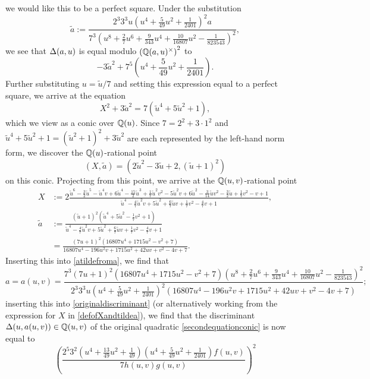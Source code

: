we would like this to be a perfect square. Under the substitution 
\begin{equation} \label{atildefroma}
\tilde{a} := \frac{2^3 3^3 u \left(u^4 + \frac{5}{49}u^2 + \frac{1}{2401}\right)^2 a}{7^3 \left(u^8 + \frac{2}{7}u^6 + \frac{9}{343}u^4 + \frac{10}{16807}u^2 - \frac{1}{823543} \right)^2}, 
\end{equation}
we see that $\Delta(a,u)$ is equal modulo $\left( \mathbb{Q}(a,u)^\times \right)^2$ to 
\[
- 3 \tilde{a}^2 + 7^5 \left( u^4 + \frac{5}{49}u^2 + \frac{1}{2401} \right).
\]
Further substituting $u = \tilde{u}/7$ and setting this expression equal to a perfect square, we arrive at the equation
\[
X^2 + 3 \tilde{a}^2 = 7 \left( \tilde{u}^4 + 5\tilde{u}^2 + 1 \right),
\]
which we view as a conic over $\mathbb{Q}(u)$. Since $7 = 2^2 + 3 \cdot 1^2$ and $\tilde{u}^4 + 5\tilde{u}^2 + 1 = (\tilde{u}^2+1)^2 + 3\tilde{u}^2$ are each represented by the left-hand norm form, we discover the $\mathbb{Q}(u)$-rational point
\[
(X,\tilde{a}) = \left( 2\tilde{u}^2 - 3\tilde{u} + 2, (\tilde{u} + 1)^2 \right)
\]
on this conic. Projecting from this point, we arrive at the $\mathbb{Q}(u,v)$-rational point
\begin{equation} \label{defofXandtildea}
\begin{split}
X &:= 2 \frac{\tilde{u}^6 - \frac{3}{2}\tilde{u}^5 - \tilde{u}^4v + 6\tilde{u}^4 - \frac{15}{2}\tilde{u}^3 + \frac{1}{7}\tilde{u}^2v^2 - 5\tilde{u}^2v + 6\tilde{u}^2 - \frac{3}{14}\tilde{u}v^2 - \frac{3}{2}\tilde{u} + \frac{1}{7}v^2 - v + 1}{\tilde{u}^4 - \frac{4}{7}\tilde{u}^2v + 5\tilde{u}^2 + \frac{6}{7}\tilde{u}v + \frac{1}{7}v^2 - \frac{4}{7}v + 1}, \\
\tilde{a} &:= \frac{(\tilde{u}+1)^2\left( \tilde{u}^4 + 5\tilde{u}^2 - \frac{1}{7}v^2 + 1 \right)}{\tilde{u}^4 - \frac{4}{7}\tilde{u}^2v + 5\tilde{u}^2 + \frac{6}{7}\tilde{u}v + \frac{1}{7}v^2 - \frac{4}{7}v + 1} \\
&= \frac{(7u+1)^2\left( 16807u^4 + 1715u^2 - v^2 + 7 \right)}{16807u^4 - 196u^2v + 1715u^2 + 42uv + v^2 - 4v + 7}.
\end{split}
\end{equation}
Inserting this into \eqref{atildefroma}, we find that
\[
a = a(u,v) = \frac{7^3 (7u+1)^2\left( 16807u^4 + 1715u^2 - v^2 + 7 \right) \left(u^8 + \frac{2}{7}u^6 + \frac{9}{343}u^4 + \frac{10}{16807}u^2 - \frac{1}{823543} \right)^2}{2^3 3^3 u \left(u^4 + \frac{5}{49}u^2 + \frac{1}{2401}\right)^2\left( 16807u^4 - 196u^2v + 1715u^2 + 42uv + v^2 - 4v + 7 \right)};
\] 
inserting this into \eqref{originaldiscriminant} (or alternatively working from the expression for $X$ in \eqref{defofXandtildea}), we find that the discriminant $\Delta(u,a(u,v)) \in \mathbb{Q}(u,v)$ of the original quadratic \eqref{secondequationconic} is now equal to
\[
\left( \frac{2^5 3^2\left( u^4 + \frac{13}{49}u^2 + \frac{1}{49} \right) \left( u^4 + \frac{5}{49}u^2 + \frac{1}{2401} \right) f(u,v)}{7h(u,v)g(u,v)} \right)^2
\]

